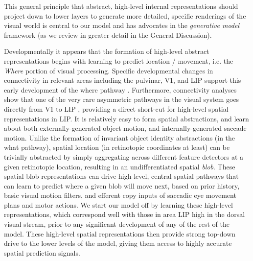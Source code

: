 \documentclass[11pt,twoside]{article}
\newif\myifpdf
\begin{document}
This general principle that abstract, high-level internal representations should project down to lower layers to generate more detailed, specific renderings of the visual world is central to our model and has advocates in the {\em generative model} framework \cite[e.g.,]{CarpenterGrossberg87,Mumford92,KawatoHayakawaInui93,Ullman95,DayanHintonNealEtAl95,RaoBallard99,LeeMumford03,Friston05,HintonSalakhutdinov06,YuilleKersten06,Friston08,Friston10,Lee15,Clark13,Valpola14,RasmusBerglundHonkalaEtAl15} (as we review in greater detail in the General Discussion).

Developmentally it appears that the formation of high-level abstract representations begins with learning to predict location / movement, i.e. the {\em Where} portion of visual processing. Specific developmental changes in connectivity in relevant areas including the pulvinar, V1, and LIP support this early development of the where pathway \cite{BridgeLeopoldBourne16}. Furthermore, connectivity analyses show that one of the very rare asymmetric pathways in the visual system goes directly from V1 to LIP , providing a direct short-cut for high-level spatial representations in LIP. It is relatively easy to form spatial abstractions, and learn about both externally-generated object motion, and internally-generated saccade motion.  Unlike the formation of invariant object identity abstractions (in the what pathway), spatial location (in retinotopic coordinates at least) can be trivially abstracted by simply aggregating across different feature detectors at a given retinotopic location, resulting in an undifferentiated spatial {\em blob}.  These spatial blob representations can drive high-level, central spatial pathways that can learn to predict where a given blob will move next, based on prior history, basic visual motion filters, and efferent copy inputs of saccadic eye movement plans and motor actions.  We start our model off by learning these high-level representations, which correspond well with those in area LIP high in the dorsal visual stream, prior to any significant development of any of the rest of the model.  These high-level spatial representations then provide strong top-down drive to the lower levels of the model, giving them access to highly accurate spatial prediction signals.
\end{document}
